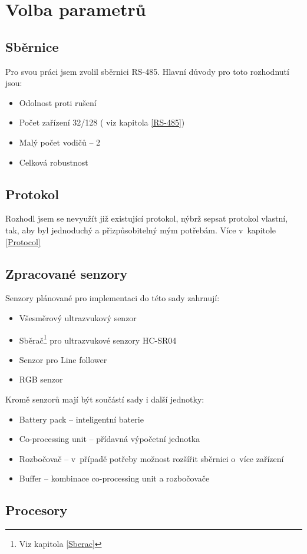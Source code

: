 \chapter{Volba parametrů}
\section{Sběrnice}
Pro svou práci jsem zvolil sběrnici RS-485.
Hlavní důvody pro toto rozhodnutí jsou:
\begin{itemize}
    \item Odolnost proti rušení
    \item Počet zařízení 32/128 ( viz kapitola \ref{RS-485})
    \item Malý počet vodičů -- 2
    \item Celková robustnost
\end{itemize}

\section{Protokol}
Rozhodl jsem se nevyužít již existující protokol, nýbrž sepsat protokol vlastní, tak, aby byl jednoduchý a přizpůsobitelný mým potřebám.
Více v~kapitole \ref{Protocol} 
\section{Zpracované senzory}
Senzory plánované pro implementaci do této sady zahrnují:
\begin{itemize}
    \item Všesměrový ultrazvukový senzor
    \item Sběrač\footnote{Viz kapitola \ref{Sberac}} pro ultrazvukové senzory HC-SR04 
    \item Senzor pro Line follower
    \item RGB senzor
    
\end{itemize}
Kromě senzorů mají být součástí sady i další jednotky:
\begin{itemize}
    \item Battery pack -- inteligentní baterie
    \item Co-processing unit -- přídavná výpočetní jednotka
    \item Rozbočovač -- v~případě potřeby možnost rozšířit sběrnici o~více zařízení
    \item Buffer -- kombinace co-processing unit a rozbočovače
\end{itemize}
\section{Procesory}

